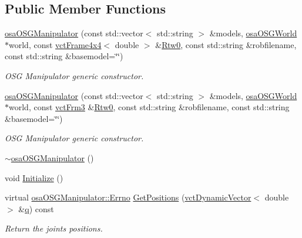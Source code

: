\subsection*{Public Member Functions}
\begin{DoxyCompactItemize}
\item 
\hyperlink{classosa_o_s_g_manipulator_ac18f717541d9cc52b7c537c960b3a036}{osa\-O\-S\-G\-Manipulator} (const std\-::vector$<$ std\-::string $>$ \&models, \hyperlink{classosa_o_s_g_world}{osa\-O\-S\-G\-World} $\ast$world, const \hyperlink{classvct_frame4x4}{vct\-Frame4x4}$<$ double $>$ \&\hyperlink{classrob_manipulator_ab48d9d9a166bf252698bc35788ca6ad6}{Rtw0}, const std\-::string \&robfilename, const std\-::string \&basemodel=\char`\"{}\char`\"{})
\begin{DoxyCompactList}\small\item\em O\-S\-G Manipulator generic constructor. \end{DoxyCompactList}\item 
\hyperlink{classosa_o_s_g_manipulator_a99b45c43d0bfb6b703a81badb53295ab}{osa\-O\-S\-G\-Manipulator} (const std\-::vector$<$ std\-::string $>$ \&models, \hyperlink{classosa_o_s_g_world}{osa\-O\-S\-G\-World} $\ast$world, const \hyperlink{vct_transformation_types_8h_a81feda0a02c2d1bc26e5553f409fed20}{vct\-Frm3} \&\hyperlink{classrob_manipulator_ab48d9d9a166bf252698bc35788ca6ad6}{Rtw0}, const std\-::string \&robfilename, const std\-::string \&basemodel=\char`\"{}\char`\"{})
\begin{DoxyCompactList}\small\item\em O\-S\-G Manipulator generic constructor. \end{DoxyCompactList}\item 
\hyperlink{classosa_o_s_g_manipulator_ad00b00abff7586792564e7f8c7290cc0}{$\sim$osa\-O\-S\-G\-Manipulator} ()
\item 
void \hyperlink{classosa_o_s_g_manipulator_a6c0df23ade21ee3e76f43bd060fb40dc}{Initialize} ()
\item 
virtual \hyperlink{classrob_manipulator_a7bbb51cdb81c9c681075a9274ca0cdc0}{osa\-O\-S\-G\-Manipulator\-::\-Errno} \hyperlink{classosa_o_s_g_manipulator_a7b3b2cba59afcbde372ebca786093de9}{Get\-Positions} (\hyperlink{classvct_dynamic_vector}{vct\-Dynamic\-Vector}$<$ double $>$ \&\hyperlink{classosa_o_s_g_manipulator_a834ce7263dace4d925133753522abaa3}{q}) const 
\begin{DoxyCompactList}\small\item\em Return the joints positions. \end{DoxyCompactList}\item 

\end{DoxyCompactItemize}
